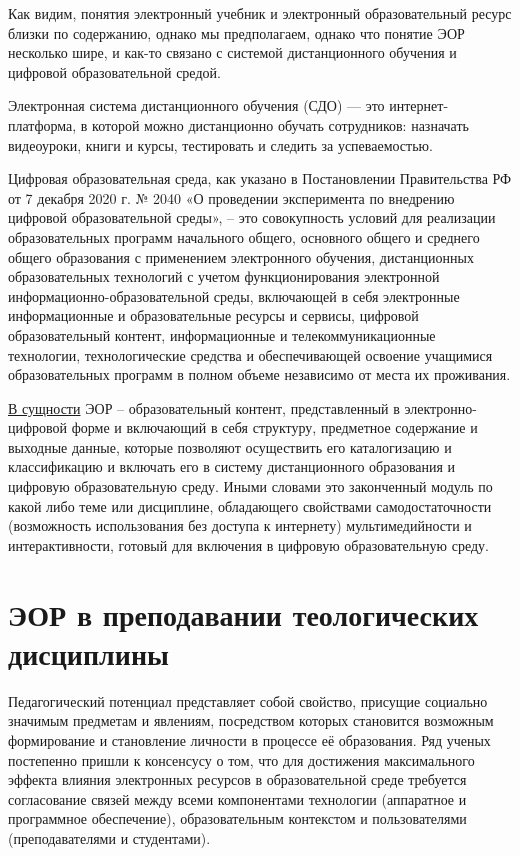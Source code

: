 Как видим, понятия электронный учебник и электронный образовательный ресурс близки по содержанию, однако мы предполагаем, однако что понятие ЭОР несколько шире, и как-то связано с системой дистанционного обучения и цифровой образовательной средой.

Электронная система дистанционного обучения (СДО) — это интернет-платформа, в которой можно дистанционно обучать сотрудников: назначать видеоуроки, книги и курсы, тестировать и следить за успеваемостью. 

Цифровая образовательная среда, как указано в Постановлении Правительства РФ от 7 декабря 2020 г. № 2040 «О проведении эксперимента по внедрению цифровой образовательной среды», – это совокупность условий для реализации образовательных программ начального общего, основного общего и среднего общего образования с применением электронного обучения, дистанционных образовательных технологий с учетом функционирования электронной информационно-образовательной среды, включающей в себя электронные информационные и образовательные ресурсы и сервисы, цифровой образовательный контент, информационные и телекоммуникационные технологии, технологические средства и обеспечивающей освоение учащимися образовательных программ в полном объеме независимо от места их проживания.

\hyperref[task1]{В сущности} ЭОР –  образовательный контент,  представленный в электронно-цифровой форме и включающий в себя структуру, предметное содержание и выходные данные, которые позволяют осуществить его каталогизацию и классификацию и включать его в систему дистанционного образования и цифровую образовательную среду\cite{gost}. Иными словами это законченный модуль по какой либо теме или дисциплине, обладающего свойствами самодостаточности (возможность использования без доступа к интернету) мультимедийности и интерактивности, готовый для включения в цифровую образовательную среду.

\section{ЭОР в преподавании теологических дисциплины}
Педагогический потенциал представляет собой свойство, присущие социально значимым предметам и явлениям, посредством которых становится возможным формирование и становление личности в процессе её образования. Ряд ученых постепенно пришли к консенсусу о том, что для достижения максимального эффекта влияния электронных ресурсов в образовательной среде требуется согласование связей между всеми компонентами технологии (аппаратное и программное обеспечение), образовательным контекстом и пользователями (преподавателями и студентами)\cite{ivinskaya22}.

